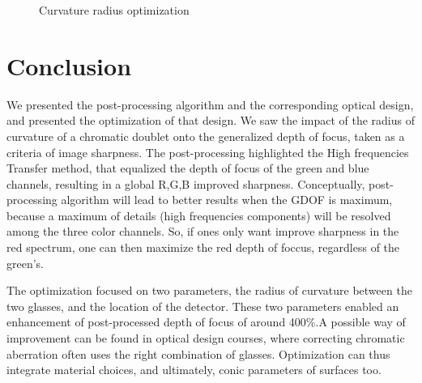 \documentclass[10pt,letterpaper]{article}
\begin{document}
\begin{figure}[h]
    \centering
	\caption{Curvature radius optimization}
\end{figure}



\section{Conclusion}
We presented the post-processing algorithm and the corresponding optical design, and presented the optimization of that design. We saw the impact of the radius of curvature of a chromatic doublet onto the generalized depth of focus, taken as a criteria of image sharpness. The post-processing highlighted the High frequencies Transfer method, that equalized the depth of focus of the green and blue channels, resulting in a global R,G,B improved sharpness. Conceptually, post-processing algorithm will lead to better results when the GDOF is maximum, because a maximum of details (high frequencies components) will be resolved among the three color channels. So, if ones only want improve sharpness in the red spectrum, one can then maximize the red depth of foccus, regardless of the green's.

The optimization focused on two parameters, the radius of curvature between the two glasses, and the location of the detector. These two parameters enabled an enhancement of post-processed depth of focus of around 400\%.A possible way of improvement can be found in optical design courses, where correcting chromatic aberration often uses the right combination of glasses. Optimization can thus integrate material choices, and ultimately, conic parameters of surfaces too.

\pagebreak

\listoffigures
\end{document}
